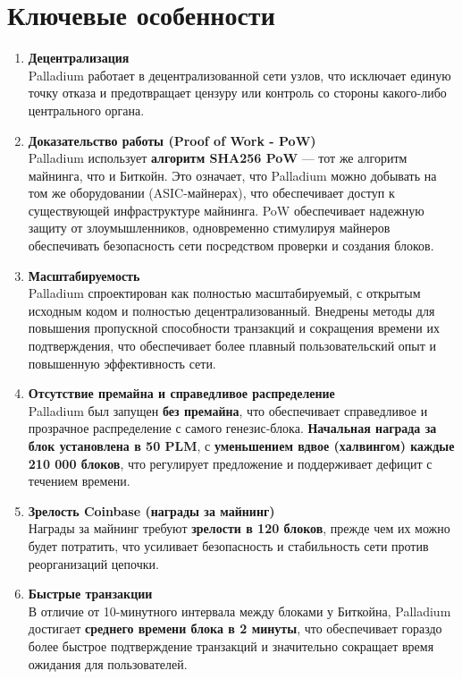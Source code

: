 \documentclass[11pt,a4paper]{article}
\begin{document}
\section{Ключевые особенности}
\begin{enumerate}
    \item \textbf{Децентрализация} \\ 
    Palladium работает в децентрализованной сети узлов, что исключает единую точку отказа и предотвращает цензуру или контроль со стороны какого-либо центрального органа.

    \item \textbf{Доказательство работы (Proof of Work - PoW)} \\ 
    Palladium использует \textbf{алгоритм SHA256 PoW} — тот же алгоритм майнинга, что и Биткойн. Это означает, что Palladium можно добывать на том же оборудовании (ASIC-майнерах), что обеспечивает доступ к существующей инфраструктуре майнинга. PoW обеспечивает надежную защиту от злоумышленников, одновременно стимулируя майнеров обеспечивать безопасность сети посредством проверки и создания блоков.

    \item \textbf{Масштабируемость} \\ 
    Palladium спроектирован как полностью масштабируемый, с открытым исходным кодом и полностью децентрализованный. Внедрены методы для повышения пропускной способности транзакций и сокращения времени их подтверждения, что обеспечивает более плавный пользовательский опыт и повышенную эффективность сети.

    \item \textbf{Отсутствие премайна и справедливое распределение} \\ 
    Palladium был запущен \textbf{без премайна}, что обеспечивает справедливое и прозрачное распределение с самого генезис-блока. \textbf{Начальная награда за блок установлена в 50 PLM}, с \textbf{уменьшением вдвое (халвингом) каждые 210 000 блоков}, что регулирует предложение и поддерживает дефицит с течением времени.

    \item \textbf{Зрелость Coinbase (награды за майнинг)} \\ 
    Награды за майнинг требуют \textbf{зрелости в 120 блоков}, прежде чем их можно будет потратить, что усиливает безопасность и стабильность сети против реорганизаций цепочки.

    \item \textbf{Быстрые транзакции} \\ 
    В отличие от 10-минутного интервала между блоками у Биткойна, Palladium достигает \textbf{среднего времени блока в 2 минуты}, что обеспечивает гораздо более быстрое подтверждение транзакций и значительно сокращает время ожидания для пользователей.


\end{enumerate}
\end{document}
